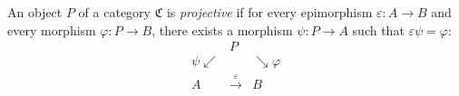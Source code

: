 An object $P$ of a category $\mathfrak{C}$ is \textit{projective} if for every epimorphism $\varepsilon : A \to B$ and every morphism $\varphi : P \to B$, there exists a morphism $\psi : P \to A$ such that $\varepsilon \psi = \varphi$:
$$
\begin{array}{ccc}
& P & \\
{\scriptstyle\psi}\swarrow & & \searrow{\scriptstyle\varphi} \\
A & \xrightarrow{\varepsilon} & B
\end{array}
$$
